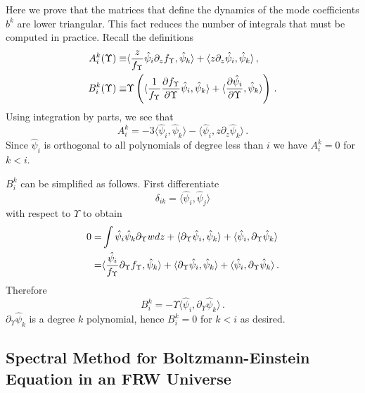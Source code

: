 Here we prove that the matrices that define the dynamics of the mode coefficients $b^k$ are lower triangular. This fact reduces the number of integrals that must be computed in practice.  Recall the definitions
\begin{align}\label{eq:lowerTri1}
A^k_i(\Upsilon)\equiv&\langle\frac{z}{f_\Upsilon }\hat\psi_i\partial_zf_\Upsilon ,\hat\psi_k\rangle+\langle z\partial_z \hat\psi_i,\hat\psi_k\rangle\,,\\
B^k_i(\Upsilon)\equiv &\Upsilon\left(\langle\frac{1}{f_\Upsilon }\frac{\partial f_\Upsilon }{\partial\Upsilon}\hat\psi_i,\hat\psi_k\rangle+\langle\frac{\partial\hat{\psi}_i}{\partial \Upsilon},\hat\psi_k\rangle\right)\,.\notag
\end{align}
Using integration by parts, we see that
\begin{equation}\label{eq:lowerTri2}
A^k_i=-3\langle\hat\psi_i,\hat\psi_k\rangle-\langle \hat \psi_i,z\partial_z\hat\psi_k\rangle\,.
\end{equation}
Since $\hat\psi_i$ is orthogonal to all polynomials of degree less than $i$ we have $A^k_i=0$ for  $k<i$.  

$B^k_i$ can be simplified as follows.  First differentiate 
\begin{equation}
\delta_{ik}=\langle \hat\psi_i,\hat\psi_j\rangle
\end{equation}
with respect to $\Upsilon$ to obtain
\begin{align}
0=&\int \hat\psi_i\hat\psi_k\partial_{\Upsilon}wdz+\langle \partial_{\Upsilon}\hat\psi_i,\hat\psi_k\rangle+\langle \hat\psi_i,\partial_{\Upsilon}\hat\psi_k\rangle\\
=&\langle\frac{\hat\psi_i}{f_\Upsilon}\partial_{\Upsilon}f_\Upsilon,\hat\psi_k \rangle+\langle\partial_{\Upsilon}\hat\psi_i,\hat\psi_k\rangle+\langle \hat\psi_i,\partial_{\Upsilon}\hat\psi_k\rangle\,.\notag
\end{align}
Therefore 
\begin{equation}\label{eq:lowerTri5}
B^k_i=-\Upsilon\langle\hat\psi_i,\partial_{\Upsilon}\hat\psi_k\rangle\,.
\end{equation}
$\partial_\Upsilon \hat\psi_k$ is a degree $k$ polynomial, hence $B_i^k=0$ for $k<i$ as desired.



\subsection{Spectral Method for Boltzmann-Einstein Equation  in an FRW Universe}\label{sec:theMethod}

